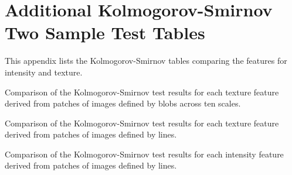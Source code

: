 \chapter{Additional Kolmogorov-Smirnov Two Sample Test Tables}
\label{appendix:ks-test}
This appendix lists the Kolmogorov-Smirnov tables comparing the features for intensity and texture.

\begin{table}[H]
\label{table:blob-texture-ks}
\centering
{}
\caption{Comparison of the Kolmogorov-Smirnov test results for each texture feature derived from patches of images defined by blobs across ten scales.}
\end{table}


\begin{table}[H]
\label{table:line-texture-ks}
\centering
{}
\caption{Comparison of the Kolmogorov-Smirnov test results for each texture feature derived from patches of images defined by lines.}
\end{table}

\begin{table}[H]
\label{table:line-intensity-ks}
\centering
{}
\caption{Comparison of the Kolmogorov-Smirnov test results for each intensity feature derived from patches of images defined by lines.}
\end{table}
